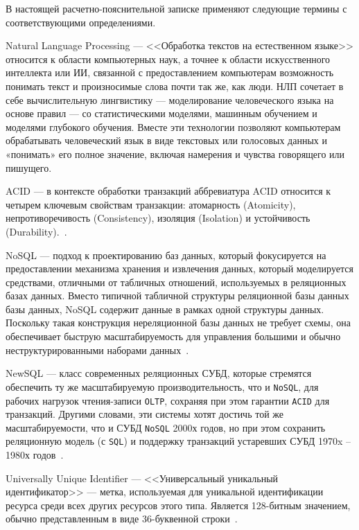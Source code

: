 
В настоящей расчетно-пояснительной записке применяют следующие термины с соответствующими определениями.\\

\begin{description}
	\item{Natural Language Processing} --- <<Обработка текстов на естественном языке>> относится к области компьютерных наук, а точнее к области искусственного интеллекта или ИИ, связанной с предоставлением компьютерам возможность понимать текст и произносимые слова почти так же, как люди.
   НЛП сочетает в себе вычислительную лингвистику — моделирование человеческого языка на основе правил — со статистическими моделями, машинным обучением и моделями глубокого обучения. Вместе эти технологии позволяют компьютерам обрабатывать человеческий язык в виде текстовых или голосовых данных и «понимать» его полное значение, включая намерения и чувства говорящего или пишущего.~\cite{nlp}
	\item{ACID} --- в контексте обработки транзакций аббревиатура ACID относится к четырем ключевым свойствам транзакции: атомарность (Atomicity), непротиворечивость (Consistency), изоляция (Isolation) и устойчивость (Durability).~\cite{gdb-def}.
	\item{NoSQL} --- подход к проектированию баз данных, который фокусируется на предоставлении механизма хранения и извлечения данных, который моделируется средствами, отличными от табличных отношений, используемых в реляционных базах данных. Вместо типичной табличной структуры реляционной базы данных базы данных, NoSQL содержит данные в рамках одной структуры данных. Поскольку такая конструкция нереляционной базы данных не требует схемы, она обеспечивает быструю масштабируемость для управления большими и обычно неструктурированными наборами данных~\cite{nosql}.
	\item{NewSQL} --- класс современных реляционных СУБД, которые стремятся обеспечить ту же масштабируемую производительность, что и \texttt{NoSQL}, для рабочих нагрузок чтения-записи \texttt{OLTP}, сохраняя при этом гарантии \texttt{ACID} для транзакций.
		Другими словами, эти системы хотят достичь той же масштабируемости, что и СУБД \texttt{NoSQL} 2000х годов, но при этом сохранить реляционную модель (с \texttt{SQL}) и поддержку транзакций устаревших СУБД 1970x -- 1980х годов~\cite{newsql}.
	\item{Universally Unique Identifier} --- <<Универсальный уникальный идентификатор>> --- метка, используемая для уникальной идентификации ресурса среди всех других ресурсов этого типа. Является 128-битным значением, обычно представленным в виде 36-буквенной строки~\cite{uuid}.
\end{description}
